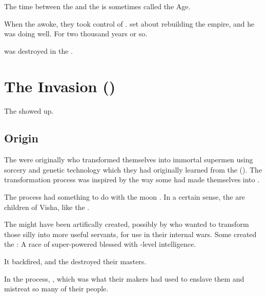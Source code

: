 The time between the \firstbanewar{} and the  is sometimes called the \Saphyraean{} Age. 

When the \dragons awoke, they took control of \Saphyrae. 
\Nexagglachel set about rebuilding the \ophidian empire, and he was doing well. 
For two thousand years or so. 

\Saphyrae was destroyed in the \secondbanewar. 















\section{The \Aryoth Invasion ()}
The \aryothim{} showed up. 





\subsection{Origin}
The \aryothim{} were originally \nephilim{} who transformed themselves into immortal supermen using sorcery and genetic technology which they had originally learned from the \ophidians{} (). 
The transformation process was inspired by the way some \ophidians{} had made themselves into \dzraicchenosses.

The process had something to do with the moon . 
In a certain sense, the \aryothim{} are children of Visha, like the \vorcanths. 


The \aryothim{} might have been artifically created, possibly by \ophidians{} who wanted to transform those silly \nephilim{} into more useful servants, for use in their internal wars. 
Some \quiljaaran created the \aryothim: A race of super-powered \nephilim blessed with \quiljaar-level intelligence.

It backfired, and the \aryothim{} destroyed their masters.

In the process, , which was what their makers had used to enslave them and mistreat so many of their people. 

